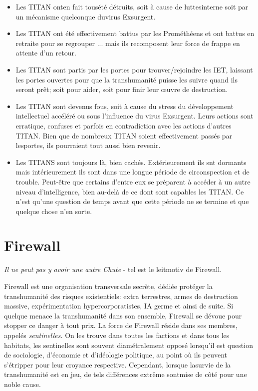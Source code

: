 \begin{itemize} \item Les TITAN onten fait tousété détruits, soit à cause de luttesinterne soit par un mécanisme quelconque duvirus Exsurgent. \item Les TITAN ont été effectivement battus par les Prométhéens et ont battus en retraite pour se regrouper ... mais ils recomposent leur force de frappe en attente d'un retour. \item Les TITAN sont partis par les portes pour trouver/rejoindre les IET, laissant les portes ouvertes pour que la transhumanité puisse les suivre quand ils seront prêt; soit pour aider, soit pour finir leur œuvre de destruction. \item Les TITAN sont devenus fous, soit à cause du stress du développement intellectuel accéléré ou sous l'influence du virus Exsurgent. Leurs actions sont erratique, confuses et parfois en contradiction avec les actions d'autres TITAN. Bien que de nombreux TITAN soient effectivement passés par lesportes, ils pourraient tout aussi bien revenir. \item Les TITANS sont toujours là, bien cachés. Extérieurement ils snt dormants mais intérieurement ils sont dans une longue période de circonspection et de trouble. Peut-être que certains d'entre eux se préparent à accéder à un autre niveau d'intelligence, bien au-delà de ce dont sont capables les TITAN. Ce n'est qu'une question de temps avant que cette période ne se termine et que quelque chose n'en sorte. \end{itemize} 

\section{Firewall} 

\textit{Il ne peut pas y avoir une autre Chute } - tel est le leitmotiv de Firewall. 

Firewall est une organisation transversale secrète, dédiée protéger la transhumanité des risques existentiels: extra terrestres, armes de destruction massive, expérimentation hypercorporatistes, IA germe et ainsi de suite. Si quelque menace la transhumanité dans son ensemble, Firewall se dévoue pour stopper ce danger à tout prix. La force de Firewall réside dans ses membres, appelés \textit{sentinelles.} On les trouve dans toutes les factions et dans tous les habitats, les sentinelles sont souvent diamétralement opposé lorsqu'il est question de sociologie, d'économie et d'idéologie politique, au point où ils peuvent s'étripper pour leur croyance respective. Cependant, lorsque lasurvie de la transhumanité est en jeu, de tels différences extrême sontmise de côté pour une noble cause. 

